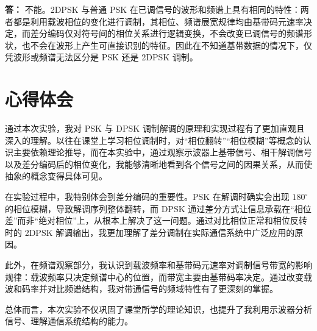 \documentclass{xjtureport}
\begin{document}
\textbf{答：}
不能。2DPSK 与普通 PSK 在已调信号的波形和频谱上具有相同的特性：两者都是利用载波相位的变化进行调制，其相位、频谱展宽规律均由基带码元速率决定，而差分编码仅对符号间的相位关系进行逻辑变换，不会改变已调信号的频谱形状，也不会在波形上产生可直接识别的特征。因此在不知道基带数据的情况下，仅凭波形或频谱无法区分是 PSK 还是 2DPSK 调制。

\section{心得体会}

通过本次实验，我对 PSK 与 DPSK 调制解调的原理和实现过程有了更加直观且深入的理解。以往在课堂上学习相位调制时，对“相位翻转”“相位模糊”等概念的认识主要依赖理论推导，而在本实验中，通过观察示波器上基带信号、相干解调信号以及差分编码后的相位变化，我能够清晰地看到各个信号之间的因果关系，从而使抽象的概念变得具体可见。

在实验过程中，我特别体会到差分编码的重要性。PSK 在解调时确实会出现 $180^\circ$ 的相位模糊，导致解调序列整体翻转，而 DPSK 通过差分方式让信息承载在“相位差”而非“绝对相位”上，从根本上解决了这一问题。通过对比相位正常和相位反转时的 2DPSK 解调输出，我更加理解了差分调制在实际通信系统中广泛应用的原因。

此外，在频谱观察部分，我认识到载波频率和基带码元速率对调制信号带宽的影响规律：载波频率只决定频谱中心的位置，而带宽主要由基带码率决定。通过改变载波和码率并对比频谱结构，我对带通信号的频域特性有了更深刻的掌握。

总体而言，本次实验不仅巩固了课堂所学的理论知识，也提升了我利用示波器分析信号、理解通信系统结构的能力。
\end{document}
